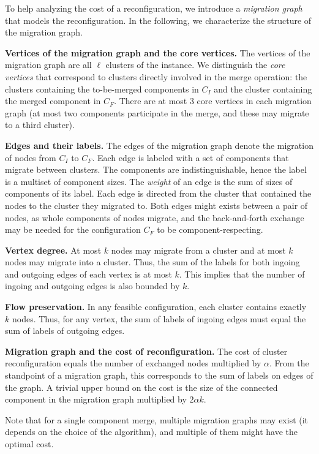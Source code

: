 \documentclass[a4paper,anonymous,USenglish]{lipics-v2019}
\begin{document}
To help analyzing the cost of a reconfiguration, we introduce a \emph{migration graph} that models the reconfiguration.
In the following, we characterize the structure of the migration graph.

\noindent
\textbf{Vertices of the migration graph and the core vertices.}
The vertices of the migration graph are all $\ell$ clusters of the instance.
We distinguish the \emph{core vertices} that correspond to clusters directly involved in the merge operation: the clusters containing the to-be-merged components in $C_I$ and the cluster containing the merged component in $C_F$.
There are at most $3$ core vertices in each migration graph (at most two components participate in the merge, and these may migrate to a third cluster).

\noindent
\textbf{Edges and their labels.}
The edges of the migration graph denote the migration of nodes from $C_I$ to $C_F$.
Each edge is labeled with a set of components that migrate between clusters.
The components are indistinguishable, hence the label is a multiset of component
sizes.
The \emph{weight} of an edge is the sum of sizes of components of its label.
Each edge is directed from the cluster that contained the nodes to the cluster they migrated to.
Both edges might exists between a pair of nodes, as whole components of nodes migrate, and the back-and-forth exchange may be needed for the configuration $C_F$ to be component-respecting.

\noindent
\textbf{Vertex degree.}
At most $k$ nodes may migrate from a cluster and at most $k$ nodes may migrate into a cluster.
Thus, the sum of the labels for both ingoing and outgoing edges of each vertex is at most $k$.
This implies that the number of ingoing and outgoing edges is also bounded by $k$.

\noindent
\textbf{Flow preservation.}
In any feasible configuration, each cluster contains exactly $k$ nodes.
Thus, for any vertex, the sum of labels of ingoing edges must equal the sum of labels of outgoing edges.

\noindent
\textbf{Migration graph and the cost of reconfiguration.}
The cost of cluster reconfiguration equals the number of exchanged nodes multiplied by $\alpha$.
From the standpoint of a migration graph, this corresponds to the sum of labels on edges of the graph.
A trivial upper bound on the cost is the size of the connected component in the migration graph multiplied by $2\alpha k$.

\medskip

Note that for a single component merge, multiple migration graphs may exist (it
depends on the choice of the algorithm), and multiple of them might have the optimal cost.

  
  


\appendix
\end{document}

